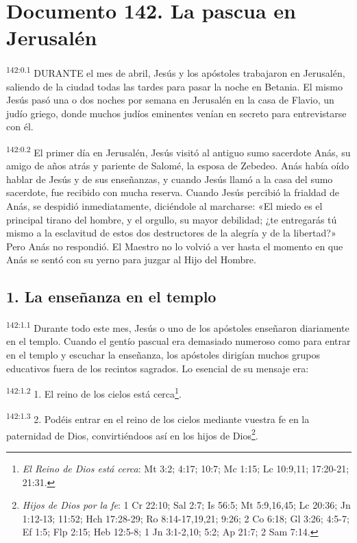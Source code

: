 \chapter{Documento 142. La pascua en Jerusalén}
\par 
\textsuperscript{142:0.1} DURANTE el mes de abril, Jesús y los apóstoles trabajaron en Jerusalén, saliendo de la ciudad todas las tardes para pasar la noche en Betania. El mismo Jesús pasó una o dos noches por semana en Jerusalén en la casa de Flavio, un judío griego, donde muchos judíos eminentes venían en secreto para entrevistarse con él.

\par 
\textsuperscript{142:0.2} El primer día en Jerusalén, Jesús visitó al antiguo sumo sacerdote Anás, su amigo de años atrás y pariente de Salomé, la esposa de Zebedeo. Anás había oído hablar de Jesús y de sus enseñanzas, y cuando Jesús llamó a la casa del sumo sacerdote, fue recibido con mucha reserva. Cuando Jesús percibió la frialdad de Anás, se despidió inmediatamente, diciéndole al marcharse: «El miedo es el principal tirano del hombre, y el orgullo, su mayor debilidad; ¿te entregarás tú mismo a la esclavitud de estos dos destructores de la alegría y de la libertad?» Pero Anás no respondió. El Maestro no lo volvió a ver hasta el momento en que Anás se sentó con su yerno para juzgar al Hijo del Hombre.

\section*{1. La enseñanza en el templo}
\par 
\textsuperscript{142:1.1} Durante todo este mes, Jesús o uno de los apóstoles enseñaron diariamente en el templo. Cuando el gentío pascual era demasiado numeroso como para entrar en el templo y escuchar la enseñanza, los apóstoles dirigían muchos grupos educativos fuera de los recintos sagrados. Lo esencial de su mensaje era:

\par 
\textsuperscript{142:1.2} 1. El reino de los cielos está cerca\footnote{\textit{El Reino de Dios está cerca}: Mt 3:2; 4:17; 10:7; Mc 1:15; Lc 10:9,11; 17:20-21; 21:31.}.

\par 
\textsuperscript{142:1.3} 2. Podéis entrar en el reino de los cielos mediante vuestra fe en la paternidad de Dios, convirtiéndoos así en los hijos de Dios\footnote{\textit{Hijos de Dios por la fe}: 1 Cr 22:10; Sal 2:7; Is 56:5; Mt 5:9,16,45; Lc 20:36; Jn 1:12-13; 11:52; Hch 17:28-29; Ro 8:14-17,19,21; 9:26; 2 Co 6:18; Gl 3:26; 4:5-7; Ef 1:5; Flp 2:15; Heb 12:5-8; 1 Jn 3:1-2,10; 5:2; Ap 21:7; 2 Sam 7:14.}.

